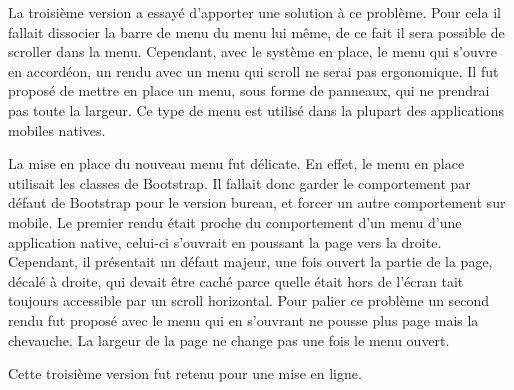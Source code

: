 \documentclass[12pt,a4paper]{article}
\begin{document}
\medskip
La troisième version a essayé d'apporter une solution à ce problème. Pour cela il fallait dissocier la barre de menu du menu lui même, de ce fait il sera possible de scroller dans la menu. Cependant, avec le système en place, le menu qui s'ouvre en accordéon, un rendu avec un menu qui scroll ne serai pas ergonomique. Il fut proposé de mettre en place un menu, sous forme de panneaux, qui ne prendrai pas toute la largeur. Ce type de menu est utilisé dans la plupart des applications mobiles natives.\par
La mise en place du nouveau menu fut délicate. En effet, le menu en place utilisait les classes de Bootstrap. Il fallait donc garder le comportement par défaut de Bootstrap pour le version bureau, et forcer un autre comportement sur mobile. Le premier rendu était proche du comportement d'un menu d'une application native, celui-ci s'ouvrait en poussant la page vers la droite. Cependant, il présentait un défaut majeur, une fois ouvert la partie de la page, décalé à droite, qui devait être caché parce quelle était hors de l'écran tait toujours accessible par un scroll horizontal. Pour palier ce problème un second rendu fut proposé avec le menu qui en s'ouvrant ne pousse plus page mais la chevauche. La largeur de la page ne change pas une fois le menu ouvert.\par 
Cette troisième version fut retenu pour une mise en ligne.
\end{document}
